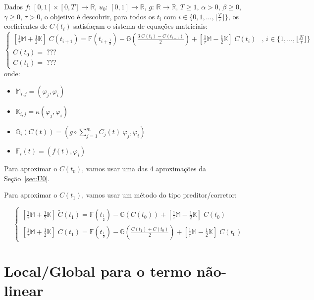 \documentclass[a4paper]{article}
\newcommand{\typ}{:\,}
\newcommand{\vphi}{\varphi}
\begin{document}
Dados
\(f \typ [0, 1] \times [0, T] \to \mathbb{R}\),
\(u_0 \typ [0, 1] \to \mathbb{R}\),
\(g \typ \mathbb{R} \to \mathbb{R}\),
\(T \ge 1\),
\(\alpha > 0\),
\(\beta \ge 0\),
\(\gamma \ge 0\),
\(\tau > 0\),
o objetivo é descobrir,
para todos os \(t_i\)
com \(i \in \{ 0, 1, \dots, \lfloor \frac{T}{\tau} \rfloor \}\),
os coeficientes de \(C(t_i)\)
satisfaçam o sistema de equações matriciais:
\[ \begin{cases}
    \left[ \frac1\tau \mathbb{M} + \frac12 \mathbb{K} \right] \; C(t_{i+1})
    = \mathbb{F}\left( t_{i+\frac12} \right)
    - \mathbb{G}\left( \frac{3 \; C(t_i) - C(t_{i-1})}{2} \right)
    + \left[ \frac1\tau \mathbb{M} - \frac12 \mathbb{K} \right] \; C(t_i)
        &\text{, } i \in \{ 1, \dots, \lfloor \frac{N}{\tau} \rfloor \}
    \\
    C(t_0) = \; ???
    \\
    C(t_1) = \; ???
\end{cases} \]
onde:
\begin{itemize}
\item \(
    \mathbb{M}_{i, j} = (\vphi_j, \vphi_i)
\)
\item \(
    \mathbb{K}_{i, j} = \kappa(\vphi_j, \vphi_i)
\)
\item \(
    \mathbb{G}_{i}(C(t)) = (g \circ \sum_{j=1}^m{ C_j(t) \; \vphi_j }, \vphi_i)
\)
\item \(
    \mathbb{F}_i(t) = (f(t), \vphi_i)
\)
\end{itemize}

Para aproximar o \(C(t_0)\),
vamos usar uma das 4 aproximações da Seção~\ref{sec:U0}.

Para aproximar o \(C(t_1)\),
vamos usar um método do tipo preditor/corretor:

\[ \begin{cases}
    \left[ \frac1\tau \mathbb{M} + \frac12 \mathbb{K} \right] \; \tilde{C}(t_1)
    = \mathbb{F}\left( t_{\frac12} \right)
    - \mathbb{G}\left( C(t_0) \right)
    + \left[ \frac1\tau \mathbb{M} - \frac12 \mathbb{K} \right] \; C(t_0)
    \\
    \left[ \frac1\tau \mathbb{M} + \frac12 \mathbb{K} \right] \; C(t_1)
    = \mathbb{F}\left( t_{\frac12} \right)
    - \mathbb{G}\left( \frac{\tilde{C}(t_1) + C(t_0)}{2} \right)
    + \left[ \frac1\tau \mathbb{M} - \frac12 \mathbb{K} \right] \; C(t_0)
\end{cases} \]

\section{Local/Global para o termo não-linear}
\end{document}
